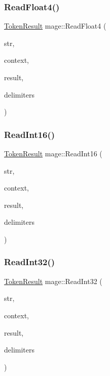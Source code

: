 \hypertarget{namespacemage_a50641f4da68522a4f74582f428f955d2}{}\label{namespacemage_a50641f4da68522a4f74582f428f955d2} 
\subsubsection{\texorpdfstring{Read\+Float4()}{ReadFloat4()}}
{\footnotesize\ttfamily \hyperlink{namespacemage_a2178ba2411db5912f41b2e7698c2037d}{Token\+Result} mage\+::\+Read\+Float4 (\begin{DoxyParamCaption}\item[{char $\ast$}]{str,  }\item[{char $\ast$$\ast$}]{context,  }\item[{X\+M\+F\+L\+O\+A\+T4 \&}]{result,  }\item[{const char $\ast$}]{delimiters }\end{DoxyParamCaption})}

\hypertarget{namespacemage_ae5362fb3f4d97bcecd70e5baeb22834f}{}\label{namespacemage_ae5362fb3f4d97bcecd70e5baeb22834f} 
\subsubsection{\texorpdfstring{Read\+Int16()}{ReadInt16()}}
{\footnotesize\ttfamily \hyperlink{namespacemage_a2178ba2411db5912f41b2e7698c2037d}{Token\+Result} mage\+::\+Read\+Int16 (\begin{DoxyParamCaption}\item[{char $\ast$}]{str,  }\item[{char $\ast$$\ast$}]{context,  }\item[{int16\+\_\+t \&}]{result,  }\item[{const char $\ast$}]{delimiters }\end{DoxyParamCaption})}

\hypertarget{namespacemage_a159df5ff8941b52ea523d0ebb4c2fd24}{}\label{namespacemage_a159df5ff8941b52ea523d0ebb4c2fd24} 
\subsubsection{\texorpdfstring{Read\+Int32()}{ReadInt32()}}
{\footnotesize\ttfamily \hyperlink{namespacemage_a2178ba2411db5912f41b2e7698c2037d}{Token\+Result} mage\+::\+Read\+Int32 (\begin{DoxyParamCaption}\item[{char $\ast$}]{str,  }\item[{char $\ast$$\ast$}]{context,  }\item[{int32\+\_\+t \&}]{result,  }\item[{const char $\ast$}]{delimiters }\end{DoxyParamCaption})}

